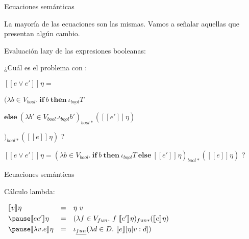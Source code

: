 \documentclass[handout]{beamer}
\newcommand{\sem}[2]{[\![#1]\!]_{#2}}
\begin{document}
\begin{frame}{Ecuaciones semánticas}

La mayoría de las ecuaciones son las mismas. Vamos a señalar aquellas que presentan algún cambio. 


\bigskip

Evaluación lazy de las expresiones booleanas:

\bigskip
¿Cuál es el problema con :

$\sem{e\vee e'}{}\eta =$

\bigskip

\qquad$(\lambda b\in V_{bool}.\ \textbf{if}\ b\ \textbf{then}\ \iota_{\underline{bool}} T\ $

\smallskip


\qquad\qquad\qquad\qquad$\textbf{else}\  (\lambda b'\in V_{bool}.  \iota_{\underline{bool}} b' )_{bool*}(\sem{e'}{}\eta)$

\smallskip

\qquad$)_{bool*}(\sem{e}{}\eta)
$ ? \pause \bigskip


$\sem{e\vee e'}{}\eta = (\lambda b\in V_{bool}.\ \textbf{if}\ b\ \textbf{then}\ \iota_{\underline{bool}} T\ \textbf{else}\ \sem{e'}{}\eta)_{bool*}(\sem{e}{}\eta)$ ?

\end{frame}


\begin{frame}{Ecuaciones semánticas}

Cálculo lambda:

\bigskip


$
\begin{array}{lcl}
\sem{v}{}\eta& = & \eta\ v\smallskip\\ \pause
\sem{ee'}{}\eta& = & (\lambda f\in V_{fun}.\ f\ \sem{e'}{}\eta)_{fun*}(\sem{e}{}\eta)\smallskip\\ \pause
\sem{\lambda v. e}{}\eta& = & \iota_{\underline{fun}}(\lambda d\in D.\ \sem{e}{}[\eta|v:d])\smallskip\\
\end{array}
$

\end{frame}



\end{document}
